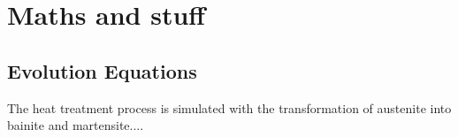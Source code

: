 

% 

\chapter{Maths and stuff}
\thispagestyle{fancy}


\label{chap:maths}

\section{Evolution Equations}
\label{sec:evoeq}

The heat treatment process is simulated with the transformation of austenite into bainite and martensite.... 

